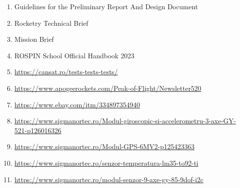 \begin{enumerate}
    \item Guidelines for the Preliminary Report And Design Document
    \item Rocketry Technical Brief
    \item Mission Brief
    \item ROSPIN School Official Handbook 2023
    \item \url{https://cansat.ro/tests-tests-tests/}
    \item \url{https://www.apogeerockets.com/Peak-of-Flight/Newsletter520}
    \item \url{https://www.ebay.com/itm/334897354940}
    \item \url{https://www.sigmanortec.ro/Modul-giroscopic-si-accelerometru-3-axe-GY-521-p126016326}
    \item \url{https://www.sigmanortec.ro/Modul-GPS-6MV2-p125423363}
    \item \url{https://www.sigmanortec.ro/senzor-temperatura-lm35-to92-ti}
    \item \url{https://www.sigmanortec.ro/modul-senzor-9-axe-gy-85-9dof-i2c}
\end{enumerate}

